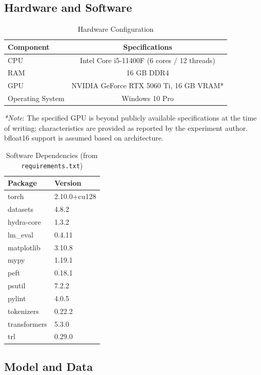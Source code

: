 \documentclass[a4paper,12pt]{article}
\begin{document}
\subsection{Hardware and Software}

\begin{table}[H]
\centering
\caption{Hardware Configuration}
\label{tab:hardware}
\begin{tabular}{lc}
\toprule
\textbf{Component} & \textbf{Specifications} \\
\midrule
CPU & Intel Core i5-11400F (6 cores / 12 threads) \\
RAM & 16 GB DDR4 \\
GPU & NVIDIA GeForce RTX 5060 Ti, 16 GB VRAM* \\
Operating System & Windows 10 Pro \\
\bottomrule
\end{tabular}
\end{table}

\noindent\textit{*Note}: The specified GPU is beyond publicly available specifications at the time of writing; characteristics are provided as reported by the experiment author. bfloat16 support is assumed based on architecture.

\begin{table}[H]
\centering
\caption{Software Dependencies (from \texttt{requirements.txt})}
\label{tab:software}
\begin{tabular}{ll}
\toprule
\textbf{Package} & \textbf{Version} \\
\midrule
torch & 2.10.0+cu128 \\
datasets & 4.8.2 \\
hydra-core & 1.3.2 \\
lm\_eval & 0.4.11 \\
matplotlib & 3.10.8 \\
mypy & 1.19.1 \\
peft & 0.18.1 \\
psutil & 7.2.2 \\
pylint & 4.0.5 \\
tokenizers & 0.22.2 \\
transformers & 5.3.0 \\
trl & 0.29.0 \\
\bottomrule
\end{tabular}
\end{table}

\subsection{Model and Data}
\end{document}
